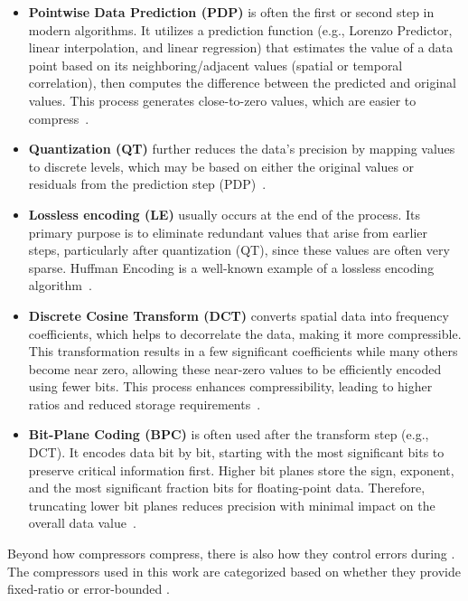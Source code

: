 \documentclass[Ingles]{ic-tese-v3}
\begin{document}
\begin{itemize}
    \item \textbf{Pointwise Data Prediction (PDP)} is often the first or second step in modern \compression algorithms. It utilizes a prediction function (e.g., Lorenzo Predictor, linear interpolation, and linear regression) that estimates the value of a data point based on its neighboring/adjacent values (spatial or temporal correlation), then computes the difference between the predicted and original values. This process generates close-to-zero values, which are easier to compress~\cite{di2025,fz,cuszp}.

    \item \textbf{Quantization (QT)} further reduces the data's precision by mapping values to discrete levels, which may be based on either the original values or residuals from the prediction step (PDP)~\cite{di2025,fz}.

    \item \textbf{Lossless encoding (LE)} usually occurs at the end of the \compression process. Its primary purpose is to eliminate redundant values that arise from earlier steps, particularly after quantization (QT), since these values are often very sparse. Huffman Encoding is a well-known example of a lossless encoding algorithm~\cite{di2025}.

    \item \textbf{Discrete Cosine Transform (DCT)} converts spatial data into frequency coefficients, which helps to decorrelate the data, making it more compressible. This transformation results in a few significant coefficients while many others become near zero, allowing these near-zero values to be efficiently encoded using fewer bits. This process enhances compressibility, leading to higher \compression ratios and reduced storage requirements~\cite{di2025}.

    \item \textbf{Bit-Plane Coding (BPC)} is often used after the transform step (e.g., DCT). It encodes data bit by bit, starting with the most significant bits to preserve critical information first. Higher bit planes store the sign, exponent, and the most significant fraction bits for floating-point data. Therefore, truncating lower bit planes reduces precision with minimal impact on the overall data value~\cite{di2025}.
\end{itemize}


Beyond how compressors compress, there is also how they control errors during \compression. The compressors used in this work are categorized based on whether they provide fixed-ratio or error-bounded \compression. 
\end{document}
